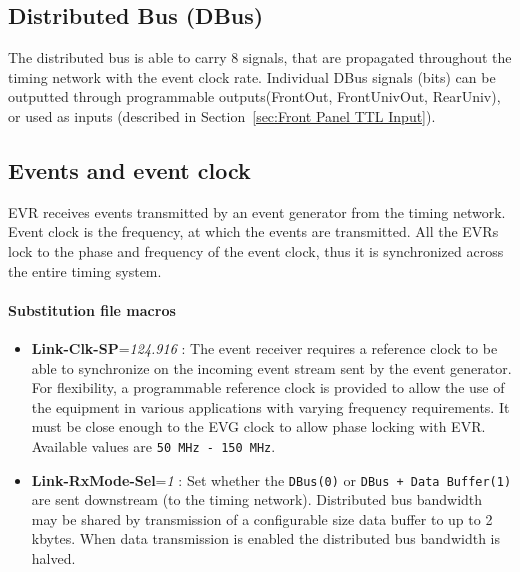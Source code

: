 \documentclass[12pt,a4paper]{article}
\begin{document}
\subsection{Distributed Bus (DBus)}\label{sec:DBus}
The distributed bus is able to carry 8 signals, that are propagated throughout the timing network with the event clock rate. Individual DBus signals (bits) can be outputted through programmable outputs(FrontOut, FrontUnivOut, RearUniv), or used as inputs (described in Section~\ref{sec:Front Panel TTL Input}).

\subsection{Events and event clock}\label{sec:Events and event clock}
EVR receives events transmitted by an event generator from the timing network. Event clock is the frequency, at which the events are transmitted. All the EVRs lock to the phase and frequency of the event clock, thus it is synchronized across the entire timing system.

\paragraph{Substitution file macros}
\begin{itemize}
\item
	\textbf{Link-Clk-SP}=\emph{124.916} : The event receiver requires a
reference clock to be able to synchronize on the incoming event
stream sent by the event generator. For flexibility, a programmable
reference clock is provided to allow the use of the equipment in
various applications with varying frequency requirements. It must be
close enough to the EVG clock to allow phase locking with
EVR. Available values are \texttt{50 MHz - 150 MHz}. 
\item
\textbf{Link-RxMode-Sel}=\emph{1} : Set whether the \texttt{DBus(0)} or
\texttt{DBus + Data Buffer(1)} are sent downstream (to the timing network). Distributed bus bandwidth may be shared by transmission of a configurable size data buffer to up to 2 kbytes. When data transmission is enabled the distributed bus bandwidth is halved. 
\end{itemize}
\end{document}
